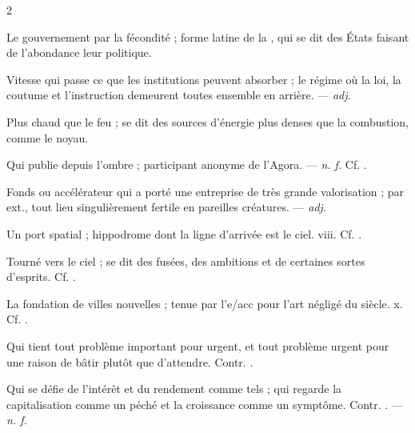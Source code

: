 \begin{multicols}{2}

 Le gouvernement par la fécondité ; forme latine de la , qui se dit des États faisant de l'abondance leur politique.

 Vitesse qui passe ce que les institutions peuvent absorber ; le régime où la loi, la coutume et l'instruction demeurent toutes ensemble en arrière. —  \textit{adj.}

 Plus chaud que le feu ; se dit des sources d'énergie plus denses que la combustion, comme le noyau. 

 Qui publie depuis l'ombre ; participant anonyme de l'Agora. —  \textit{n. f.} Cf. .

  Fonds ou accélérateur qui a porté une entreprise de très grande valorisation ; par ext., tout lieu singulièrement fertile en pareilles créatures. —  \textit{adj.}

 Un port spatial ; hippodrome dont la ligne d'arrivée est le ciel.   viii. Cf. .

 Tourné vers le ciel ; se dit des fusées, des ambitions et de certaines sortes d'esprits. Cf. .

 La fondation de villes nouvelles ; tenue par l'e/acc pour l'art négligé du siècle.   x. Cf. .

 Qui tient tout problème important pour urgent, et tout problème urgent pour une raison de bâtir plutôt que d'attendre. Contr. .

 Qui se défie de l'intérêt et du rendement comme tels ; qui regarde la capitalisation comme un péché et la croissance comme un symptôme. Contr. . —  \textit{n. f.}

\end{multicols}

